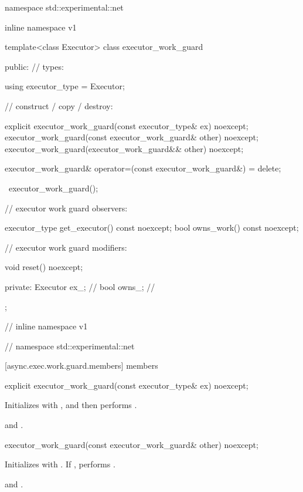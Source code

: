 %
\begin{codeblock}
namespace std::experimental::net {
inline namespace v1 {

  template<class Executor>
  class executor_work_guard
  {
  public:
    // types:

    using executor_type = Executor;

    // construct / copy / destroy:

    explicit executor_work_guard(const executor_type& ex) noexcept;
    executor_work_guard(const executor_work_guard& other) noexcept;
    executor_work_guard(executor_work_guard&& other) noexcept;

    executor_work_guard& operator=(const executor_work_guard&) = delete;

    ~executor_work_guard();

    // executor work guard observers:

    executor_type get_executor() const noexcept;
    bool owns_work() const noexcept;

    // executor work guard modifiers:

    void reset() noexcept;

  private:
    Executor ex_; // \expos
    bool owns_; // \expos
  };

} // inline namespace v1
} // namespace std::experimental::net
\end{codeblock}


[async.exec.work.guard.members]{ members}

%
\begin{itemdecl}
explicit executor_work_guard(const executor_type& ex) noexcept;
\end{itemdecl}

\begin{itemdescr}
\pnum
\effects Initializes  with , and then performs .

\pnum
\postconditions {} and .
\end{itemdescr}

%
\begin{itemdecl}
executor_work_guard(const executor_work_guard& other) noexcept;
\end{itemdecl}

\begin{itemdescr}
\pnum
\effects Initializes  with . If , performs .

\pnum
\postconditions {} and .
\end{itemdescr}

